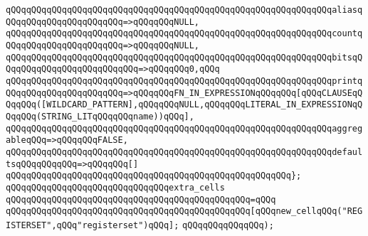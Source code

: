 \verb|qQQqqQQqqQQqqQQqqQQqqQQqqQQqqQQqqQQqqQQqqQQqqQQqqQQqqQQqqQQqqQQqaliasqQQqqQQqqQQqqQQqqQQqqQQq=>qQQqqQQqNULL,|\newline
\verb|qQQqqQQqqQQqqQQqqQQqqQQqqQQqqQQqqQQqqQQqqQQqqQQqqQQqqQQqqQQqqQQqcountqQQqqQQqqQQqqQQqqQQqqQQq=>qQQqqQQqNULL,|\newline
\verb|qQQqqQQqqQQqqQQqqQQqqQQqqQQqqQQqqQQqqQQqqQQqqQQqqQQqqQQqqQQqqQQqbitsqQQqqQQqqQQqqQQqqQQqqQQqqQQq=>qQQqqQQq0,qQQq|\newline
\verb|qQQqqQQqqQQqqQQqqQQqqQQqqQQqqQQqqQQqqQQqqQQqqQQqqQQqqQQqqQQqqQQqprintqQQqqQQqqQQqqQQqqQQqqQQq=>qQQqqQQqFN_IN_EXPRESSIONqQQqqQQq[qQQqCLAUSEqQQqqQQq([WILDCARD_PATTERN],qQQqqQQqNULL,qQQqqQQqLITERAL_IN_EXPRESSIONqQQqqQQq(STRING_LITqQQqqQQqname))qQQq],|\newline
\verb|qQQqqQQqqQQqqQQqqQQqqQQqqQQqqQQqqQQqqQQqqQQqqQQqqQQqqQQqqQQqqQQqaggregableqQQq=>qQQqqQQqFALSE,|\newline
\verb|qQQqqQQqqQQqqQQqqQQqqQQqqQQqqQQqqQQqqQQqqQQqqQQqqQQqqQQqqQQqqQQqdefaultsqQQqqQQqqQQq=>qQQqqQQq[]|\newline
\verb|qQQqqQQqqQQqqQQqqQQqqQQqqQQqqQQqqQQqqQQqqQQqqQQqqQQqqQQq};|\newline
\newline
\verb|qQQqqQQqqQQqqQQqqQQqqQQqqQQqqQQqextra_cells|\newline
\verb|qQQqqQQqqQQqqQQqqQQqqQQqqQQqqQQqqQQqqQQqqQQqqQQq=qQQq|\newline
\verb|qQQqqQQqqQQqqQQqqQQqqQQqqQQqqQQqqQQqqQQqqQQqqQQq[qQQqnew_cellqQQq("REGISTERSET",qQQq"registerset")qQQq];|\newline
\verb|qQQqqQQqqQQqqQQq);|\newline

